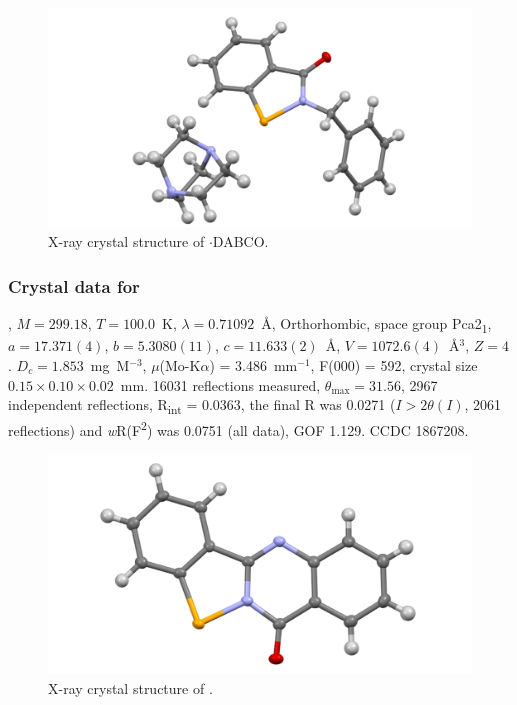 \begin{refsection}
\begin{figure}
  \includegraphics[width=0.6\linewidth]{Figures/ebs-bn-dabco-xtal.pdf}
  \caption{X-ray crystal structure of \texorpdfstring{$ \cdot $DABCO}{C20H23N3OSe}.}
\end{figure}

\subsubsection{Crystal data for \texorpdfstring{}{C14H8N2OSe}}
, $M=299.18$, $T=100.0$~K, $\lambda=0.71092$~\AA, Orthorhombic, space group Pca2\textsubscript{1}, $a = 17.371(4)$, $b = 5.3080(11)$, $c = 11.633(2)$~\AA, $V = 1072.6(4)$~\AA$^{3}$, $Z = 4$.
$D_{c}= 1.853$~mg~M$^{-3}$, $\mu$(Mo-K$\alpha$) = 3.486~mm$^{-1}$, F(000) = 592, crystal size $0.15 \times 0.10 \times 0.02$~mm.
16031 reflections measured, $\theta_{\max}=31.56$\degree, 2967 independent reflections, R\textsubscript{int} = 0.0363, the final R was 0.0271 ($I > 2\theta(I)$, 2061 reflections) and \textit{w}R(F\textsuperscript{2}) was 0.0751 (all data), GOF 1.129.
CCDC 1867208.

\begin{figure}
  \includegraphics[width=0.6\linewidth]{Figures/tetracycle-xtal.pdf}
  \caption{X-ray crystal structure of \texorpdfstring{}{C14H8N2OSe}.}
\end{figure}


\end{refsection}
